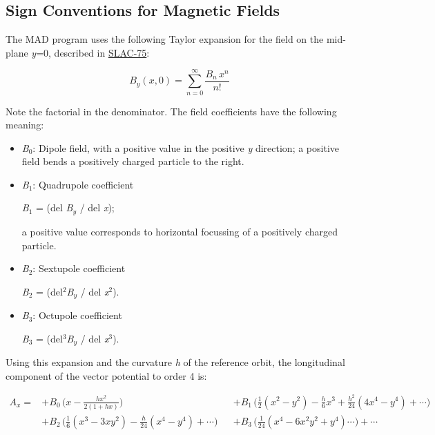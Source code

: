 




\subsection{Sign Conventions for Magnetic Fields}
 The MAD program uses the following Taylor expansion for the field on the mid-plane \textit{y}=0, described in  \href{bibliography.html#slac75}{SLAC-75}: 


$$
B_y(x,0)=\sum_{n=0}^{\infty} \frac{B_n\,x^n}{n!}
$$

 Note the factorial in the denominator. The field coefficients have the following meaning: 
\begin{itemize}
	\item \textit{B}$_0$: Dipole field, with a positive value in the  positive \textit{y} direction; a positive field bends a positively charged particle to the right. 
	\item \textit{B}$_1$: Quadrupole coefficient 

\textit{B}$_1$ = (del \textit{B$_y$} / del \textit{x}); 

 a positive value corresponds to horizontal focussing of a positively charged particle. 
	\item \textit{B}$_2$: Sextupole coefficient  

\textit{B}$_2$ =  (del$^2$\textit{B$_y$} / del \textit{x}$^2$). 


	\item \textit{B}$_3$: Octupole coefficient  

\textit{B}$_3$ =  (del$^3$\textit{B$_y$} / del \textit{x}$^3$). 


\end{itemize} Using this expansion and the curvature \textit{h} of the reference orbit, the longitudinal component of the vector potential to order 4 is: 


\[
\begin{aligned}
A_x =
&+ B_0\,\Big(x-\frac{hx^2}{2(1+hx)}\Big)&
&+ B_1\,\Big(\frac{1}{2}(x^2-y^2) - \frac{h}{6}x^3 + \frac{h^2}{24}(4x^4-y^4)+\cdots\Big) \\
&+ B_2\,\Big(\frac{1}{6}(x^3-3xy^2) - \frac{h}{24}(x^4-y^4)+\cdots \Big)&
&+ B_3\,\Big(\frac{1}{24}(x^4-6x^2y^2+y^4) \cdots \Big)+\cdots
\end{aligned}
\]

